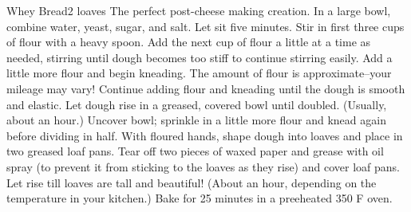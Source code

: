 \begin{recipe}{Whey Bread}{2 loaves}{}
\freeform The perfect post-cheese making creation.
In a large bowl, combine water, yeast, sugar, and salt. Let sit five minutes. Stir in first three cups of flour with a heavy spoon. Add the next cup of flour a little at a time as needed, stirring until dough becomes too stiff to continue stirring easily. Add a little more flour and begin kneading. The amount of flour is approximate–your mileage may vary! Continue adding flour and kneading until the dough is smooth and elastic. Let dough rise in a greased, covered bowl until doubled. (Usually, about an hour.) Uncover bowl; sprinkle in a little more flour and knead again before dividing in half. With floured hands, shape dough into loaves and place in two greased loaf pans. Tear off two pieces of waxed paper and grease with oil spray (to prevent it from sticking to the loaves as they rise) and cover loaf pans. Let rise till loaves are tall and beautiful! (About an hour, depending on the temperature in your kitchen.) Bake for 25 minutes in a preeheated 350 F oven.
\end{recipe}
